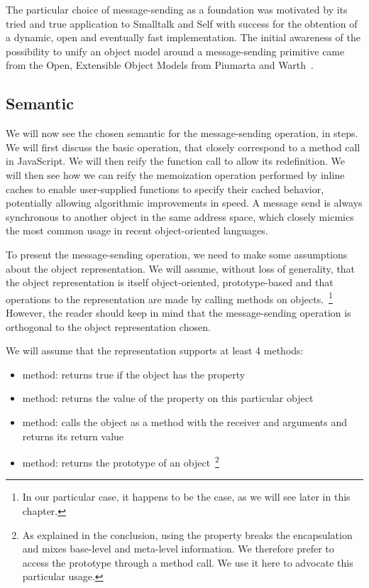 The particular choice of message-sending as a foundation was motivated by its
tried and true application to Smalltalk and Self with success for the obtention
of a dynamic, open and eventually fast implementation. The initial awareness of
the possibility to unify an object model around a message-sending primitive
came from the Open, Extensible Object Models from Piumarta and
Warth~\cite{Piumarta:2008}.

\subsection{Semantic}

We will now see the chosen semantic for the message-sending operation, in
steps. We will first discuss the basic operation, that closely correspond to a
method call in JavaScript. We will then reify the function call to allow its
redefinition. We will then see how we can reify the memoization operation
performed by inline caches to enable user-supplied functions to specify their
cached behavior, potentially allowing algorithmic improvements in speed. A
message send is always synchronous to another object in the same address space,
which closely micmics the most common usage in recent object-oriented
languages.

To present the message-sending operation, we need to make some assumptions
about the object representation. We will assume, without loss of generality,
that the object representation is itself object-oriented, prototype-based and
that operations to the representation are made by calling methods on
objects.~\footnote{In our particular case, it happens to be the case, as
we will see later in this chapter.} However, the reader should keep in mind
that the message-sending operation is orthogonal to the object representation
chosen. 

We will assume that the representation supports at least 4 methods:
\begin{itemize}
    \item {} method: returns true if the object has the 
    property
    \item {} method: returns the value of the  property on
    this particular object
    \item {} method: calls the object as a method with the
     receiver and  arguments and returns its return value
    \item {} method: returns the prototype of an
    object~\footnote{As explained in the conclusion, using the 
    property breaks the encapsulation and mixes base-level and meta-level
    information. We therefore prefer to access the prototype through a method
    call. We use it here to advocate this particular usage.}
\end{itemize}

